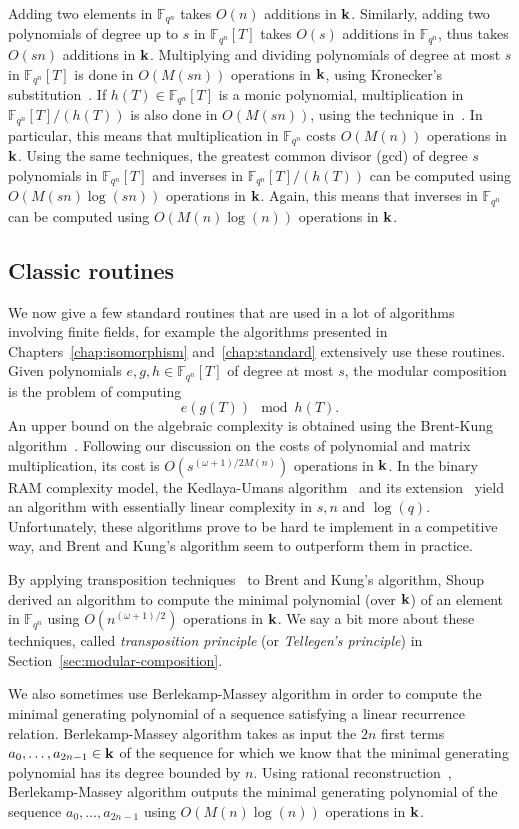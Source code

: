 Adding two elements in $\mathbb{F}_{q^n}$ takes $O(n)$ additions in $\mathbf{k}$.
Similarly, adding two polynomials of degree up to $s$ in $\mathbb{F}_{q^n}\left[
T \right]$ takes $O(s)$ additions in $\mathbb{F}_{q^n}$, thus takes $O(sn)$
additions in $\mathbf{k}$. Multiplying and dividing polynomials of degree at most $s$ in
$\mathbb{F}_{q^n}\left[ T \right]$ is done in $O(M(sn))$
operations in $\mathbf{k}$, using Kronecker's substitution~\cite{Moenck76, Kaltofen87,
GG13, GS92, Harvey09}. If $h(T)\in\mathbb{F}_{q^n}[T]$ is a monic polynomial,
multiplication in $\mathbb{F}_{q^n}[T]/(h(T))$ is also done in $O(M(sn))$, using
the technique in~\cite{PS06}. In particular, this means that multiplication in
$\mathbb{F}_{q^n}$ costs $O(M(n))$ operations in $\mathbf{k}$. Using the same techniques,
the greatest common divisor (gcd) of degree $s$ polynomials in
$\mathbb{F}_{q^n}[T]$ and inverses in $\mathbb{F}_{q^n}[T]/(h(T))$ can be
computed using $O(M(sn)\log(sn))$ operations in $\mathbf{k}$. Again, this means that
inverses in $\mathbb{F}_{q^n}$ can be computed using $O(M(n)\log(n))$
operations in $\mathbf{k}$.

\subsection{Classic routines}

We now give a few standard routines that are used in a lot of algorithms
involving finite fields, for example the algorithms presented in
Chapters~\ref{chap:isomorphism} and~\ref{chap:standard} extensively use these
routines.
Given polynomials $e, g, h\in\mathbb{F}_{q^n}[T]$ of degree at most $s$, the
modular composition is the problem of computing
\[
  e(g(T))\mod h(T).
\]
An upper bound on the algebraic complexity is obtained using the Brent-Kung
algorithm~\cite{BK78}. Following our discussion on the costs of polynomial
and matrix multiplication, its cost is $O(s^{(\omega+1)/2M(n)})$ operations in
$\mathbf{k}$. In the binary RAM complexity model, the Kedlaya-Umans
algorithm~\cite{KU11} and its extension~\cite{PS13} yield an algorithm with
essentially linear complexity in $s, n$ and $\log(q)$. Unfortunately, these
algorithms prove to be hard te implement in a competitive way, and Brent and
Kung's algorithm seem to outperform them in practice.

By applying transposition techniques~\cite{BLS03, DeFeo10, DS10, BCS13} to Brent
and Kung's algorithm, Shoup~\cite{Shoup94, Shoup99} derived an algorithm to
compute the minimal polynomial (over $\mathbf{k}$) of an element in $\mathbb{F}_{q^n}$
using $O(n^{(\omega+1)/2})$ operations in $\mathbf{k}$. We say a bit more about these
techniques, called \emph{transposition principle} (or \emph{Tellegen's
principle}) in Section~\ref{sec:modular-composition}.

We also sometimes use Berlekamp-Massey algorithm in order to compute the minimal
generating polynomial of a sequence satisfying a linear recurrence relation.
Berlekamp-Massey algorithm takes
as input the $2n$ first terms $a_0, \dots, a_{2n-1}\in\mathbf{k}$ of the
sequence for which we know that the minimal generating polynomial has its degree
bounded by $n$. Using rational reconstruction~\cite[Chapter 7]{BCGLLSS17},
Berlekamp-Massey algorithm outputs the minimal generating polynomial of the
sequence $a_0, \dots, a_{2n-1}$ using $O(M(n)\log(n))$ operations in $\mathbf{k}$.
